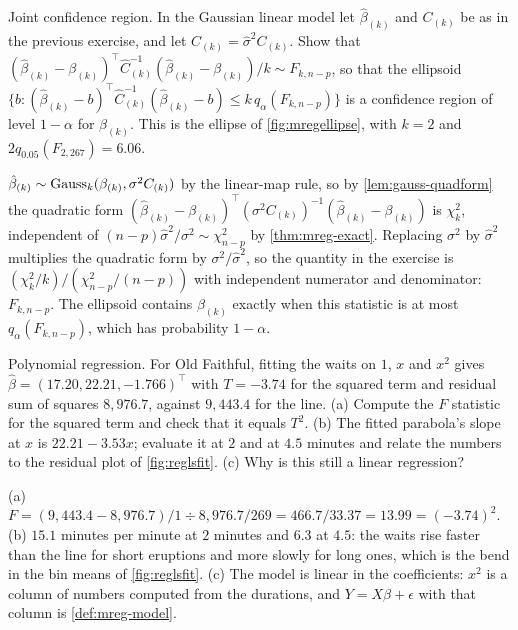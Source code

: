 \begin{exercise}
\label{ex:mreg-ellipse}
Joint confidence region. In the Gaussian linear model let $\hat{\beta}_{(k)}$ and $C_{(k)}$ be as in the previous exercise, and let $\hat{C}_{(k)} = \hat{\sigma}^2C_{(k)}$. Show that $(\hat{\beta}_{(k)} - \beta_{(k)})^\top\hat{C}_{(k)}^{-1}(\hat{\beta}_{(k)} - \beta_{(k)})/k \sim F_{k, n-p}$, so that the ellipsoid $\{b : (\hat{\beta}_{(k)} - b)^\top\hat{C}_{(k)}^{-1}(\hat{\beta}_{(k)} - b) \leq k\,q_\alpha(F_{k, n-p})\}$ is a confidence region of level $1 - \alpha$ for $\beta_{(k)}$. This is the ellipse of \cref{fig:mregellipse}, with $k = 2$ and $2q_{0.05}(F_{2, 267}) = 6.06$.
\end{exercise}
\begin{solution}
$\hat{\beta}_{(k)} \sim \text{Gauss}_k(\beta_{(k)}, \sigma^2C_{(k)})$ by the linear-map rule, so by \cref{lem:gauss-quadform} the quadratic form $(\hat{\beta}_{(k)} - \beta_{(k)})^\top(\sigma^2C_{(k)})^{-1}(\hat{\beta}_{(k)} - \beta_{(k)})$ is $\chi^2_k$, independent of $(n - p)\hat{\sigma}^2/\sigma^2 \sim \chi^2_{n-p}$ by \cref{thm:mreg-exact}. Replacing $\sigma^2$ by $\hat{\sigma}^2$ multiplies the quadratic form by $\sigma^2/\hat{\sigma}^2$, so the quantity in the exercise is $(\chi^2_k/k)/(\chi^2_{n-p}/(n - p))$ with independent numerator and denominator: $F_{k, n-p}$. The ellipsoid contains $\beta_{(k)}$ exactly when this statistic is at most $q_\alpha(F_{k, n-p})$, which has probability $1 - \alpha$.
\end{solution}

\begin{exercise}
\label{ex:mreg-quadratic}
Polynomial regression. For Old Faithful, fitting the waits on $1$, $x$ and $x^2$ gives $\hat{\beta} = (17.20, 22.21, -1.766)^\top$ with $T = -3.74$ for the squared term and residual sum of squares $8{,}976.7$, against $9{,}443.4$ for the line. (a) Compute the $F$ statistic for the squared term and check that it equals $T^2$. (b) The fitted parabola's slope at $x$ is $22.21 - 3.53x$; evaluate it at $2$ and at $4.5$ minutes and relate the numbers to the residual plot of \cref{fig:reglsfit}. (c) Why is this still a linear regression?
\end{exercise}
\begin{solution}
(a) $F = (9{,}443.4 - 8{,}976.7)/1 \div 8{,}976.7/269 = 466.7/33.37 = 13.99 = (-3.74)^2$. (b) $15.1$ minutes per minute at $2$ minutes and $6.3$ at $4.5$: the waits rise faster than the line for short eruptions and more slowly for long ones, which is the bend in the bin means of \cref{fig:reglsfit}. (c) The model is linear in the coefficients: $x^2$ is a column of numbers computed from the durations, and $Y = X\beta + \epsilon$ with that column is \cref{def:mreg-model}.
\end{solution}

